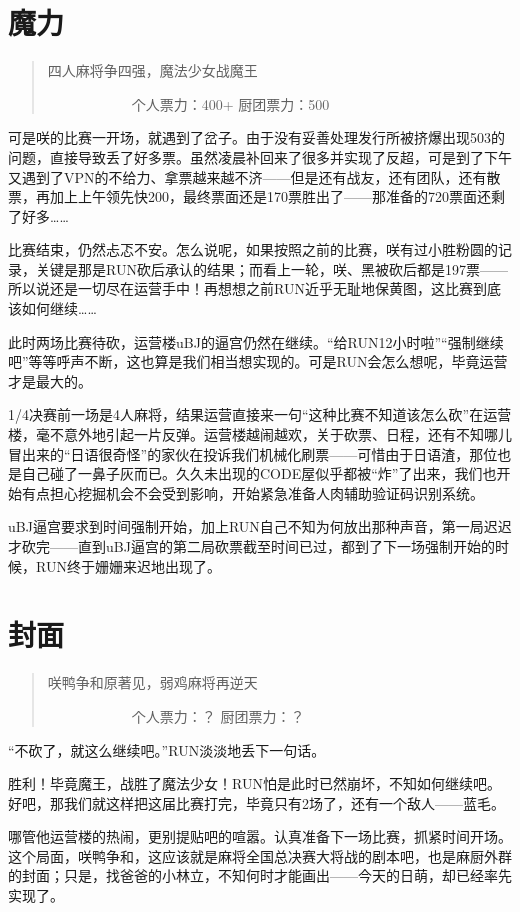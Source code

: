 \chapter{魔力}
\begin{quote}
四人麻将争四强，魔法少女战魔王

　　　　　　个人票力：400+ 厨团票力：500
\end{quote}

可是咲的比赛一开场，就遇到了岔子。由于没有妥善处理发行所被挤爆出现503的问题，直接导致丢了好多票。虽然凌晨补回来了很多并实现了反超，可是到了下午又遇到了VPN的不给力、拿票越来越不济——但是还有战友，还有团队，还有散票，再加上上午领先快200，最终票面还是170票胜出了——那准备的720票面还剩了好多……

比赛结束，仍然忐忑不安。怎么说呢，如果按照之前的比赛，咲有过小胜粉圆的记录，关键是那是RUN砍后承认的结果；而看上一轮，咲、黑被砍后都是197票——所以说还是一切尽在运营手中！再想想之前RUN近乎无耻地保黄图，这比赛到底该如何继续……

此时两场比赛待砍，运营楼uBJ的逼宫仍然在继续。“给RUN12小时啦”“强制继续吧”等等呼声不断，这也算是我们相当想实现的。可是RUN会怎么想呢，毕竟运营才是最大的。

1/4决赛前一场是4人麻将，结果运营直接来一句“这种比赛不知道该怎么砍”在运营楼，毫不意外地引起一片反弹。运营楼越闹越欢，关于砍票、日程，还有不知哪儿冒出来的“日语很奇怪”的家伙在投诉我们机械化刷票——可惜由于日语渣，那位也是自己碰了一鼻子灰而已。久久未出现的CODE屋似乎都被“炸”了出来，我们也开始有点担心挖掘机会不会受到影响，开始紧急准备人肉辅助验证码识别系统。

uBJ逼宫要求到时间强制开始，加上RUN自己不知为何放出那种声音，第一局迟迟才砍完——直到uBJ逼宫的第二局砍票截至时间已过，都到了下一场强制开始的时候，RUN终于姗姗来迟地出现了。


\chapter{封面}
\begin{quote}
咲鸭争和原著见，弱鸡麻将再逆天

　　　　　　个人票力：？ 厨团票力：？
\end{quote}

“不砍了，就这么继续吧。”RUN淡淡地丢下一句话。

胜利！毕竟魔王，战胜了魔法少女！RUN怕是此时已然崩坏，不知如何继续吧。好吧，那我们就这样把这届比赛打完，毕竟只有2场了，还有一个敌人——蓝毛。

哪管他运营楼的热闹，更别提贴吧的喧嚣。认真准备下一场比赛，抓紧时间开场。这个局面，咲鸭争和，这应该就是麻将全国总决赛大将战的剧本吧，也是麻厨外群的封面；只是，找爸爸的小林立，不知何时才能画出——今天的日萌，却已经率先实现了。

